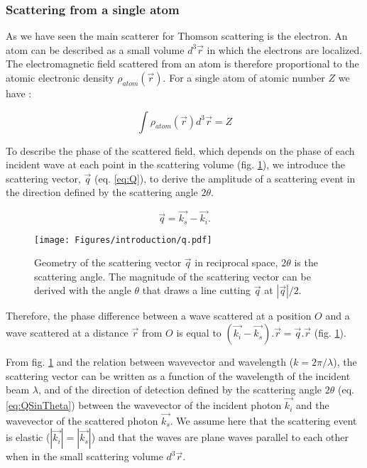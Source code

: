 \subsubsection{Scattering from a single atom}\label{sec:scattering}

As we have seen the main scatterer for Thomson scattering is the electron.
An atom can be described as a small volume $d^3\vec{r}$ in which the electrons are localized.
The electromagnetic field scattered from an atom is therefore proportional to the atomic electronic density $\rho_{atom}(\vec{r})$.
For a single atom of atomic number $Z$ we have :

\begin{equation}
    \int \rho_{atom} (\vec{r}) d^3\vec{r} = Z
\end{equation}

To describe the phase of the scattered field, which depends on the phase of each incident wave at each point in the scattering volume (fig. \ref{fig:q}), we introduce the scattering vector, $\vec{q}$ (eq. \ref{eq:Q}), to derive the amplitude of a scattering event in the direction defined by the scattering angle $2\theta$.

\begin{equation}
    \label{eq:Q}
    \vec{q}=\vec{k_s}-\vec{k_i}.
\end{equation}

\begin{figure}[!htb]
    \centering
    \texttt{[image: Figures/introduction/q.pdf]}
    \caption{
    Geometry of the scattering vector $\vec{q}$ in reciprocal space, $2\theta$ is the scattering angle.
    The magnitude of the scattering vector can be derived with the angle $\theta$ that draws a line cutting $\vec{q}$ at $|\vec{q}|/2$.
    }
    \label{fig:q}
\end{figure}

Therefore, the phase difference between a wave scattered at a position $O$ and a wave scattered at a distance $\vec{r}$ from $O$ is equal to $(\vec{k_i} - \vec{k_s}).\vec{r} = \vec{q}.\vec{r}$ (fig. \ref{fig:q}).

From fig. \ref{fig:q} and the relation between wavevector and wavelength ($k = 2 \pi/\lambda$), the scattering vector can be written as a function of the wavelength of the incident beam $\lambda$, and of the direction of detection defined by the scattering angle $2\theta$ (eq. \ref{eq:QSinTheta}) between the wavevector of the incident photon $\vec{k_i}$ and the wavevector of the scattered photon $\vec{k_s}$.
We assume here that the scattering event is elastic ($|\vec{k_i}|=|\vec{k_s}|$) and that the waves are plane waves parallel to each other when in the small scattering volume $d^3\vec{r}$.

